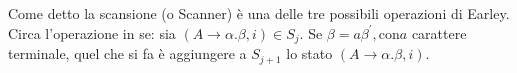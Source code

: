 \documentclass{subfiles}
\begin{document}
Come detto la scansione (o Scanner) è una delle tre possibili operazioni di Earley.
Circa l'operazione in se: sia \((A \to \alpha . \beta , i) \in S_{j}\). Se \(\beta = a\beta^{'}, \text{con} a\) carattere terminale,
quel che si fa è aggiungere a \(S_{j + 1}\) lo stato \((A \to \alpha . \beta , i)\).
\end{document}
